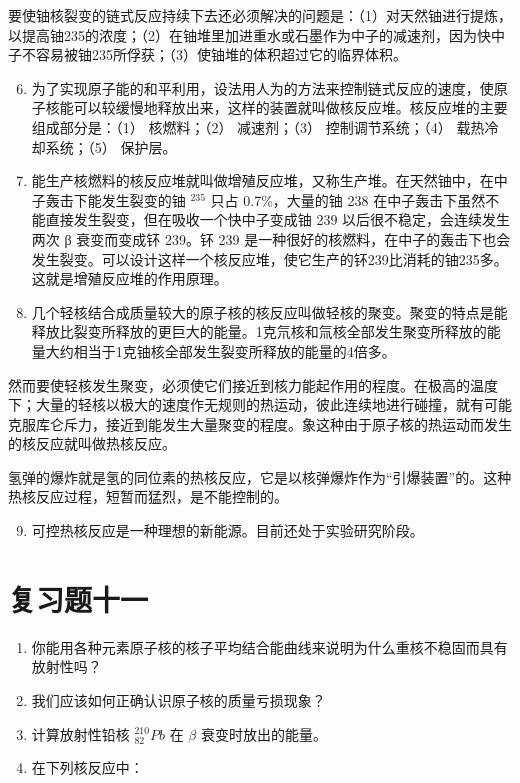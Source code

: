 要使铀核裂变的链式反应持续下去还必须解决的问题是：（1）对天然铀进行提炼，以提高铀235的浓度；（2）在铀堆里加进重水或石墨作为中子的减速剂，因为快中子不容易被铀235所俘获；（3）使铀堆的体积超过它的临界体积。

\begin{enumerate}
\setcounter{enumi}{5}
\item
  为了实现原子能的和平利用，设法用人为的方法来控制链式反应的速度，使原子核能可以较缓慢地释放出来，这样的装置就叫做核反应堆。核反应堆的主要组成部分是：（1）
  核燃料；（2） 减速剂；（3） 控制调节系统；（4） 载热冷却系统；（5）
  保护层。
\item
  能生产核燃料的核反应堆就叫做增殖反应堆，又称生产堆。在天然铀中，在中子轰击下能发生裂变的铀
  \(^{235}\) 只占 0.7\%，大量的铀 238
  在中子轰击下虽然不能直接发生裂变，但在吸收一个快中子变成铀 239
  以后很不稳定，会连续发生两次 β 衰变而变成钚 239。钚 239
  是一种很好的核燃料，在中子的轰击下也会发生裂变。可以设计这样一个核反应堆，使它生产的钚239比消耗的铀235多。这就是增殖反应堆的作用原理。
\item
  几个轻核结合成质量较大的原子核的核反应叫做轻核的聚变。聚变的特点是能释放比裂变所释放的更巨大的能量。1克氘核和氚核全部发生聚变所释放的能量大约相当于1克铀核全部发生裂变所释放的能量的4倍多。
\end{enumerate}

然而要使轻核发生聚变，必须使它们接近到核力能起作用的程度。在极高的温度下；大量的轻核以极大的速度作无规则的热运动，彼此连续地进行碰撞，就有可能克服库仑斥力，接近到能发生大量聚变的程度。象这种由于原子核的热运动而发生的核反应就叫做热核反应。

氢弹的爆炸就是氢的同位素的热核反应，它是以核弹爆炸作为``引爆装置''的。这种热核反应过程，短暂而猛烈，是不能控制的。

\begin{enumerate}
\setcounter{enumi}{8}
\item
  可控热核反应是一种理想的新能源。目前还处于实验研究阶段。
\end{enumerate}

\section{复习题十一}

\begin{enumerate}
\item
  你能用各种元素原子核的核子平均结合能曲线来说明为什么重核不稳固而具有放射性吗？
\item
  我们应该如何正确认识原子核的质量亏损现象？
\item
  计算放射性铅核 \(^{210}_{82}Pb\) 在 \(\beta\) 衰变时放出的能量。
\item
  在下列核反应中：
\end{enumerate}

